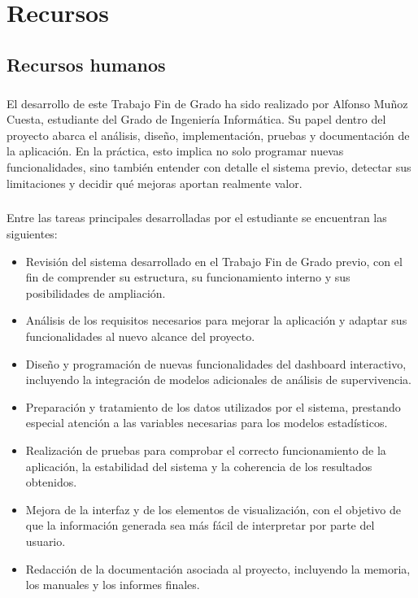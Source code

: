 \chapter{Recursos}
\label{ch:recursos}

\section{Recursos humanos}
\paragraph*{}El desarrollo de este Trabajo Fin de Grado ha sido realizado por Alfonso Muñoz Cuesta, estudiante del Grado de Ingeniería Informática. Su papel dentro del proyecto abarca el análisis, diseño, implementación, pruebas y documentación de la aplicación. En la práctica, esto implica no solo programar nuevas funcionalidades, sino también entender con detalle el sistema previo, detectar sus limitaciones y decidir qué mejoras aportan realmente valor.

\paragraph*{}Entre las tareas principales desarrolladas por el estudiante se encuentran las siguientes:

\begin{itemize}
    \item Revisión del sistema desarrollado en el Trabajo Fin de Grado previo, con el fin de comprender su estructura, su funcionamiento interno y sus posibilidades de ampliación.
    
    \item Análisis de los requisitos necesarios para mejorar la aplicación y adaptar sus funcionalidades al nuevo alcance del proyecto.
    
    \item Diseño y programación de nuevas funcionalidades del dashboard interactivo, incluyendo la integración de modelos adicionales de análisis de supervivencia.
    
    \item Preparación y tratamiento de los datos utilizados por el sistema, prestando especial atención a las variables necesarias para los modelos estadísticos.
    
    \item Realización de pruebas para comprobar el correcto funcionamiento de la aplicación, la estabilidad del sistema y la coherencia de los resultados obtenidos.
    
    \item Mejora de la interfaz y de los elementos de visualización, con el objetivo de que la información generada sea más fácil de interpretar por parte del usuario.
    
    \item Redacción de la documentación asociada al proyecto, incluyendo la memoria, los manuales y los informes finales.
\end{itemize}

